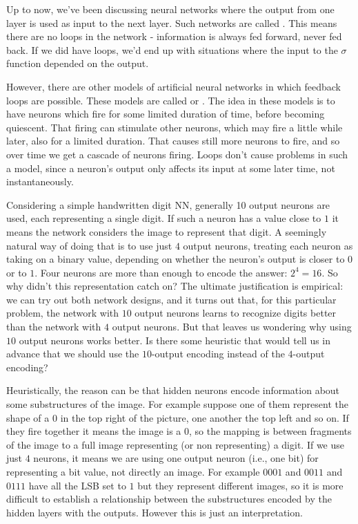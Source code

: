 Up to now, we've been discussing neural networks where the output from one layer is used as input to the next layer. Such networks are called . This means there are no loops in the network - information is always fed forward, never fed back. If we did have loops, we'd end up with situations where the input to the $\sigma$ function depended on the output. 

However, there are other models of artificial neural networks in which feedback loops are possible. These models are called  or . The idea in these models is to have neurons which fire for some limited duration of time, before becoming quiescent. That firing can stimulate other neurons, which may fire a little while later, also for a limited duration. That causes still more neurons to fire, and so over time we get a cascade of neurons firing. Loops don't cause problems in such a model, since a neuron's output only affects its input at some later time, not instantaneously.

Considering a simple handwritten digit NN, generally 10 output neurons are used, each representing a single digit. If such a neuron has a value close to $1$ it means the network considers the image to represent that digit. A seemingly natural way of doing that is to use just $4$ output neurons, treating each neuron as taking on a binary value, depending on whether the neuron's output is closer to $0$ or to $1$. Four neurons are more than enough to encode the answer: $2^4=16$. So why didn't this representation catch on? The ultimate justification is empirical: we can try out both network designs, and it turns out that, for this particular problem, the network with $10$ output neurons learns to recognize digits better than the network with $4$ output neurons. But that leaves us wondering why using $10$ output neurons works better. Is there some heuristic that would tell us in advance that we should use the $10$-output encoding instead of the $4$-output encoding?

Heuristically, the reason can be that hidden neurons encode information about some substructures of the image. For example suppose one of them represent the shape of a $0$ in the top right of the picture, one another the top left and so on. If they fire together it means the image is a $0$, so the mapping is between fragments of the image to a full image representing (or non representing) a digit. If we use just $4$ neurons, it means we are using one output neuron (i.e., one bit) for representing a bit value, not directly an image. For example $0001$ and $0011$ and $0111$ have all the LSB set to $1$ but they represent different images, so it is more difficult to establish a relationship between the substructures encoded by the hidden layers with the outputs. However this is just an interpretation.

